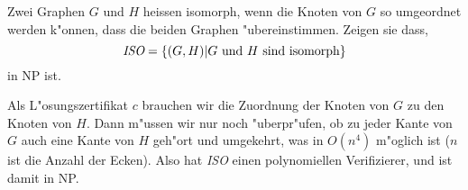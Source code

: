 Zwei Graphen $G$ und $H$ heissen isomorph, wenn die Knoten von $G$ so
umgeordnet werden k"onnen, dass die beiden Graphen "ubereinstimmen.
Zeigen sie dass,
\[
\text{\it ISO} = \{(G,H) |\text{$G$ und $H$ sind isomorph}\}
\]
in NP ist.

\begin{loesung}
Als L"osungszertifikat $c$ brauchen wir die Zuordnung der Knoten
von $G$ zu den Knoten von $H$. Dann m"ussen wir nur noch "uberpr"ufen,
ob zu jeder Kante von $G$ auch eine Kante von $H$ geh"ort und
umgekehrt, was in $O(n^4)$ m"oglich ist ($n$ ist die Anzahl der Ecken).
Also hat {\it ISO} einen polynomiellen Verifizierer, und ist damit
in NP.
\end{loesung}
